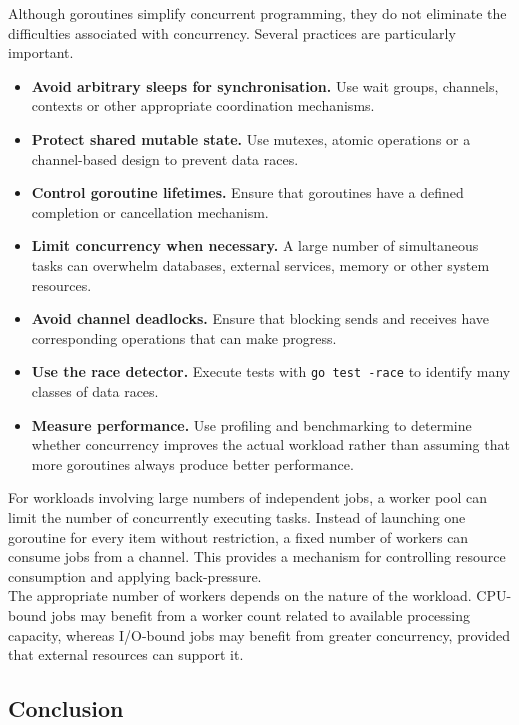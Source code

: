 Although goroutines simplify concurrent programming, they do not eliminate the difficulties associated with concurrency. Several practices are particularly important.

\begin{itemize}
    \item \textbf{Avoid arbitrary sleeps for synchronisation.} Use wait groups, channels, contexts or other appropriate coordination mechanisms.
    \item \textbf{Protect shared mutable state.} Use mutexes, atomic operations or a channel-based design to prevent data races.
    \item \textbf{Control goroutine lifetimes.} Ensure that goroutines have a defined completion or cancellation mechanism.
    \item \textbf{Limit concurrency when necessary.} A large number of simultaneous tasks can overwhelm databases, external services, memory or other system resources.
    \item \textbf{Avoid channel deadlocks.} Ensure that blocking sends and receives have corresponding operations that can make progress.
    \item \textbf{Use the race detector.} Execute tests with \texttt{go test -race} to identify many classes of data races.
    \item \textbf{Measure performance.} Use profiling and benchmarking to determine whether concurrency improves the actual workload rather than assuming that more goroutines always produce better performance.
\end{itemize}

For workloads involving large numbers of independent jobs, a worker pool can limit the number of concurrently executing tasks. Instead of launching one goroutine for every item without restriction, a fixed number of workers can consume jobs from a channel. This provides a mechanism for controlling resource consumption and applying back-pressure.\\

The appropriate number of workers depends on the nature of the workload. CPU-bound jobs may benefit from a worker count related to available processing capacity, whereas I/O-bound jobs may benefit from greater concurrency, provided that external resources can support it.

\subsection{Conclusion}

